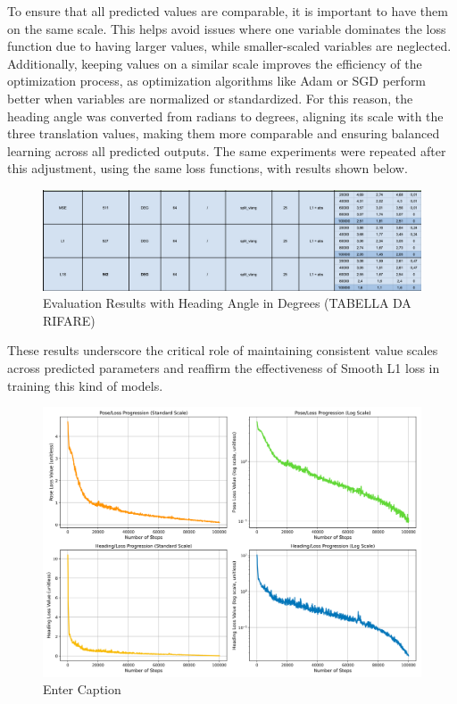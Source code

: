 To ensure that all predicted values are comparable, it is important to have them on the same scale. This helps avoid issues where one variable dominates the loss function due to having larger values, while smaller-scaled variables are neglected. Additionally, keeping values on a similar scale improves the efficiency of the optimization process, as optimization algorithms like Adam or SGD perform better when variables are normalized or standardized. For this reason, the heading angle was converted from radians to degrees, aligning its scale with the three translation values, making them more comparable and ensuring balanced learning across all predicted outputs.
The same experiments were repeated after this adjustment, using the same loss functions, with results shown below.
\begin{figure}[H]
    \centering
    \includegraphics[width=1\linewidth]{Screenshot 2024-11-14 at 11.52.27.png}
    \caption{Evaluation Results with Heading Angle in Degrees (TABELLA DA RIFARE)}
    \label{fig:degree-evaluation-results}
\end{figure}

These results underscore the critical role of maintaining consistent value scales across predicted parameters and reaffirm the effectiveness of Smooth L1 loss in training this kind of models.
\begin{figure}[H]
    \centering
    \includegraphics[width=1\linewidth]{LateX//figs/l1s_111_DEG_pose_heading_loss_comparison.png}
    \caption{Enter Caption}
    \label{fig:enter-label}
\end{figure}

